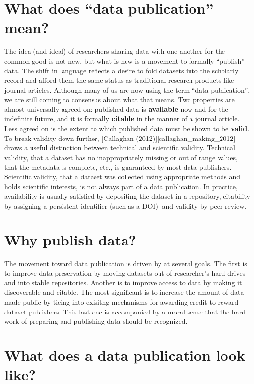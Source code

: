 \documentclass[10pt,a4paper,twocolumn]{article}
\begin{document}
\section*{What does ``data publication'' mean?}\label{what-does-data-publication-mean}

The idea (and ideal) of researchers sharing data with one another for the common good is not new, but what is new is a movement to formally ``publish'' data.
The shift in language reflects a desire to fold datasets into the scholarly record and afford them the same status as traditional research products like journal articles.
Although many of us are now using the term ``data publication'', we are still coming to consensus about what that means.
Two properties are almost universally agreed on: published data is \textbf{available} now and for the indefinite future, and it is formally \textbf{citable} in the manner of a journal article.\\Less agreed on is the extent to which published data must be shown to be \textbf{valid}.
To break validity down further, {[}Callaghan (2012){]}{[}callaghan\_making\_2012{]} draws a useful distinction between technical and scientific validity.
Technical validity, that a dataset has no inappropriately missing or out of range values, that the metadata is complete, etc., is guaranteed by most data publishers. Scientific validity, that a dataset was collected using appropriate methods and holds scientific interests, is not always part of a data publication.
In practice, availability is usually satisfied by depositing the dataset in a repository, citability by assigning a persistent identifier (such as a DOI), and validity by peer-review.

\section*{Why publish data?}\label{why-publish-data}

The movement toward data publication is driven by at several goals.
The first is to improve data preservation by moving datasets out of researcher's hard drives and into stable repositories.
Another is to improve access to data by making it discoverable and citable.
The most significant is to increase the amount of data made public by tieing into exisitng mechanisms for awarding credit to reward dataset publishers.
This last one is accompanied by a moral sense that the hard work of preparing and publishing data should be recognized.

\section*{What does a data publication look like?}\label{what-does-a-data-publication-look-like}
\end{document}
